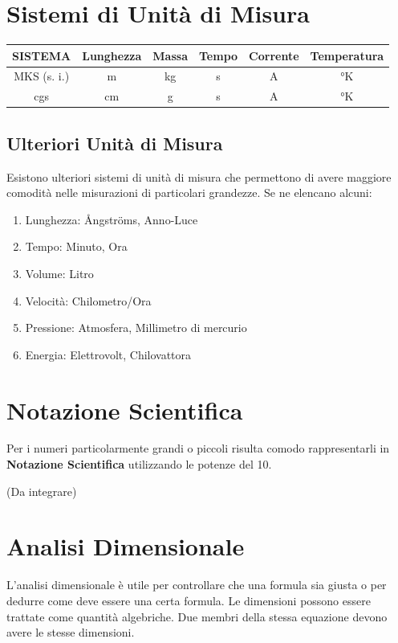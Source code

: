 \documentclass[12pt,oneside]{book}
\begin{document}
\section{Sistemi di Unità di Misura}
\begin{center}
    \bgroup
    \def\arraystretch{1.5}
    \begin{tabular}{ |c| c c c c c|}
        \hline
        SISTEMA     & Lunghezza & Massa & Tempo & Corrente & Temperatura \\
        \hline
        MKS (s. i.) & m         & kg    & s     & A        & °K          \\
        \hline
        cgs         & cm        & g     & s     & A        & °K          \\
        \hline
    \end{tabular}
    \egroup
\end{center}

\subsection{Ulteriori Unità di Misura}
Esistono ulteriori sistemi di unità di misura che permettono di avere maggiore comodità
nelle misurazioni di particolari grandezze.
Se ne elencano alcuni:

\begin{enumerate}
    \item Lunghezza:    \tabto{3cm} Ångströms, Anno-Luce
    \item Tempo:        \tabto{3cm} Minuto, Ora
    \item Volume:       \tabto{3cm} Litro
    \item Velocità:     \tabto{3cm} Chilometro/Ora
    \item Pressione:    \tabto{3cm} Atmosfera, Millimetro di mercurio
    \item Energia:      \tabto{3cm} Elettrovolt, Chilovattora
\end{enumerate}

\section{Notazione Scientifica}
Per i numeri particolarmente grandi o piccoli risulta comodo rappresentarli
in \textbf{Notazione Scientifica} utilizzando le potenze del 10.

(Da integrare)

\section{Analisi Dimensionale}
L'analisi dimensionale è utile per controllare che una formula sia giusta o per dedurre come deve
essere una certa formula.
Le dimensioni possono essere trattate come quantità algebriche. Due membri della stessa equazione devono avere le
stesse dimensioni.
\end{document}
